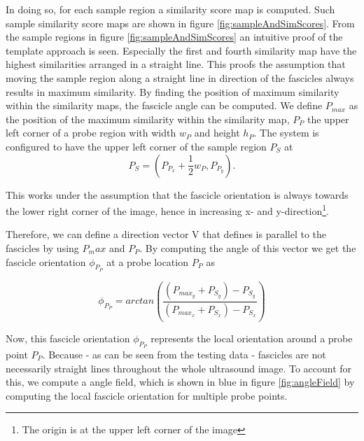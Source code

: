 \documentclass[10pt,twocolumn,letterpaper]{article}
\begin{document}
In doing so, for each sample region a similarity score map is computed. Such sample similarity score maps are shown in figure \ref{fig:sampleAndSimScores}. From the sample regions in figure \ref{fig:sampleAndSimScores} an intuitive proof of the template approach is seen. Especially the first and fourth similarity map have the highest similarities arranged in a straight line. This proofs the assumption that moving the sample region along a straight line in direction of the fascicles always results in maximum similarity. By finding the position of maximum similarity within the similarity maps, the fascicle angle can be computed. We define $P_{max}$ as the position of the maximum similarity within the similarity map, $P_P$ the upper left corner of a probe region with width $w_P$ and height $h_P$. The system is configured to have the upper left corner of the sample region $P_S$ at 
\begin{equation}
P_S=(P_{P_x}+\frac{1}{2}w_P, P_{P_y}).
\end{equation}

This works under the assumption that the fascicle orientation is always towards the lower right corner of the image, hence in increasing x- and y-direction\footnote{The origin is at the upper left corner of the image}. 

Therefore, we can define a direction vector V that defines is parallel to the fascicles by using $P_max$ and $P_P$. By computing the angle of this vector we get the fascicle orientation $\phi_{P_P}$ at a probe location $P_P$ as

\begin{equation}
\phi_{P_P} = arctan(\frac{(P_{max_y} + P_{S_y}) - P_{S_y}}{(P_{max_x} + P_{S_x}) - P_{S_x}})
\end{equation}

Now, this fascicle orientation $\phi_{P_P}$ represents the local orientation around a probe point $P_P$. Because - as can be seen from the testing data - fascicles are not necessarily straight lines throughout the whole ultrasound image. To account for this, we compute a angle field, which is shown in blue in figure \ref{fig:angleField} by computing the local fascicle orientation for multiple probe points.
\end{document}
